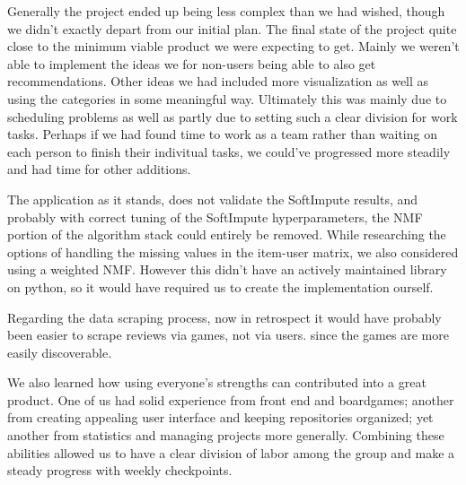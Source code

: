 \documentclass[a4paper,12pt,bibliography=totoc,numbers=noenddot,sfdefaults=false,abstract=true,notitlepage]{scrartcl} %
\begin{document}
	
	
	Generally the project ended up being less complex than we had wished, though we didn't exactly depart from our initial plan. The final state of the project quite close to the minimum viable product we were expecting to get. Mainly we weren't able to implement the ideas we for non-users being able to also get recommendations. Other ideas we had included more visualization as well as using the categories in some meaningful way. Ultimately this was mainly due to scheduling problems as well as partly due to setting such a clear division for work tasks. Perhaps if we had found time to work as a team rather than waiting on each person to finish their indivitual tasks, we could've progressed more steadily and had time for other additions.


    The application as it stands, does not validate the SoftImpute results, and probably with correct tuning of the SoftImpute hyperparameters, the NMF portion of
    the algorithm stack could entirely be removed. While researching the options of handling the missing values in the item-user matrix, we also considered using a weighted
    NMF. However this didn't have an actively maintained library on python, so it would have required us to create the implementation ourself.
    
    Regarding the data scraping process, now in retrospect it would have probably been easier to scrape reviews via games, not via users. since the games are more easily
    discoverable.
	
	We also learned how using everyone's strengths can contributed into a great product. One of us had solid experience from front end and boardgames; another from creating appealing user interface and keeping repositories organized; yet another from statistics and managing projects more generally. Combining these abilities allowed us to have a clear division of labor among the group and make a steady progress with weekly checkpoints.
	
\end{document}
